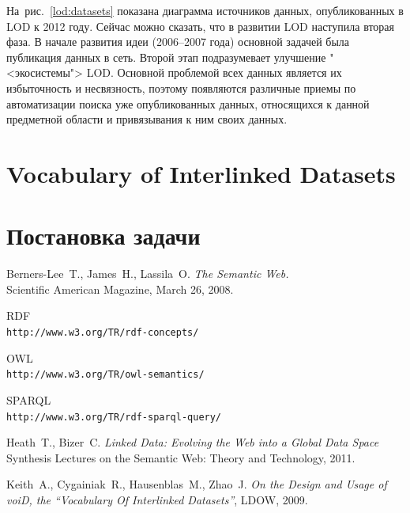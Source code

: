 \documentclass[oneside, a4paper, final, 14 pt]{extarticle}
\begin{document}
На~рис.~\ref{lod:datasets} показана диаграмма источников данных, опубликованных в LOD к 2012 году. Сейчас
можно сказать, что в развитии LOD наступила вторая фаза. В начале развития идеи (2006--2007 года)
основной задачей была публикация данных в сеть. Второй этап подразумевает улучшение "<экосистемы"> 
LOD. Основной проблемой всех данных является их избыточность и несвязность, поэтому появляются
различные приемы по автоматизации поиска уже опубликованных данных, относящихся к данной предметной
области и привязывания к ним своих данных.

\newpage
\section{Vocabulary of Interlinked Datasets}

\newpage
\section{Постановка задачи}

\newpage
\begin{thebibliography}{00}
  Berners-Lee~T., James~H., Lassila~O.
  \emph{The Semantic Web.}\\ Scientific American Magazine,  March 26, 2008.

  RDF\\
  \texttt{http://www.w3.org/TR/rdf-concepts/}

  OWL\\
  \texttt{http://www.w3.org/TR/owl-semantics/}

  SPARQL\\
  \texttt{http://www.w3.org/TR/rdf-sparql-query/}

  Heath~T., Bizer~C.
  \emph{Linked Data: Evolving the Web into a Global Data Space}\\ Synthesis Lectures on the Semantic Web: Theory and Technology, 2011.

  Keith~A., Cygainiak~R., Hausenblas~M., Zhao~J.
  \emph{On the Design and Usage of voiD, the ``Vocabulary Of Interlinked Datasets''}, LDOW, 2009.

\end{thebibliography}
\end{document}
